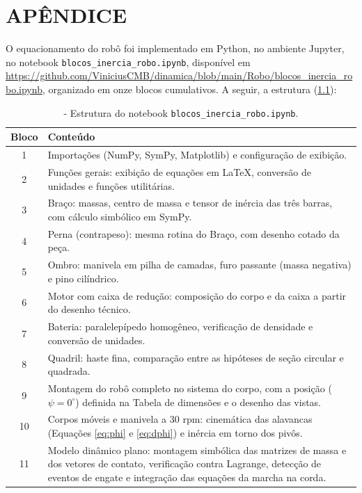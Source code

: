 \chapter{APÊNDICE}
\label{ap:codigo}

O equacionamento do robô foi implementado em Python, no ambiente Jupyter, no notebook \texttt{blocos\_inercia\_robo.ipynb}, disponível em \url{https://github.com/ViniciusCMB/dinamica/blob/main/Robo/blocos\_inercia\_robo.ipynb}, organizado em onze blocos cumulativos. A seguir, a estrutura (\ref{tab:blocos}):

\begin{table}[H]
\centering
\caption{\label{tab:blocos}- Estrutura do notebook \texttt{blocos\_inercia\_robo.ipynb}.}
\vspace*{.1cm}
\small
\begin{tabular}{|c|p{11.5cm}|}
\hline
\textbf{Bloco} & \textbf{Conteúdo} \\
\hline
1 & Importações (NumPy, SymPy, Matplotlib) e configuração de exibição. \\
\hline
2 & Funções gerais: exibição de equações em LaTeX, conversão de unidades e funções utilitárias. \\
\hline
3 & Braço: massas, centro de massa e tensor de inércia das três barras, com cálculo simbólico em SymPy. \\
\hline
4 & Perna (contrapeso): mesma rotina do Braço, com desenho cotado da peça. \\
\hline
5 & Ombro: manivela em pilha de camadas, furo passante (massa negativa) e pino cilíndrico. \\
\hline
6 & Motor com caixa de redução: composição do corpo e da caixa a partir do desenho técnico. \\
\hline
7 & Bateria: paralelepípedo homogêneo, verificação de densidade e conversão de unidades. \\
\hline
8 & Quadril: haste fina, comparação entre as hipóteses de seção circular e quadrada. \\
\hline
9 & Montagem do robô completo no sistema do corpo, com a posição ($\psi=0^\circ$) definida na Tabela de dimensões e o desenho das vistas. \\
\hline
10 & Corpos móveis e manivela a 30 rpm: cinemática das alavancas (Equações \ref{eq:phi} e \ref{eq:dphi}) e inércia em torno dos pivôs. \\
\hline
11 & Modelo dinâmico plano: montagem simbólica das matrizes de massa e dos vetores de contato, verificação contra Lagrange, detecção de eventos de engate e integração das equações da marcha na corda. \\
\hline
\end{tabular}
\end{table}

